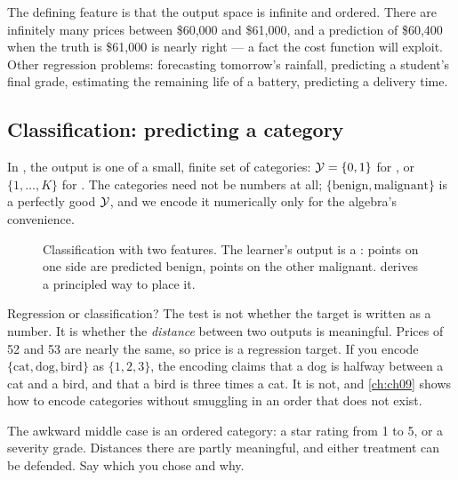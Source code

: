The defining feature is that the output space is infinite and ordered. There are
infinitely many prices between \$60{,}000 and \$61{,}000, and a prediction of
\$60{,}400 when the truth is \$61{,}000 is nearly right --- a fact the cost
function will exploit. Other regression problems: forecasting tomorrow's
rainfall, predicting a student's final grade, estimating the remaining life of a
battery, predicting a delivery time.

\subsection{Classification: predicting a category}

In , the output is one of a small, finite set of categories:
$\mathcal{Y} = \{0,1\}$ for , or $\{1,\dots,K\}$ for
. The categories need not be numbers at all;
$\{\text{benign}, \text{malignant}\}$ is a perfectly good $\mathcal{Y}$, and we
encode it numerically only for the algebra's convenience.

\begin{figure}[htbp]
  \centering
  \caption{Classification with two features. The learner's output is a
  : points on one side are predicted benign, points on
  the other malignant.  derives a principled way to place it.}
  \label{fig:classification}
\end{figure}

\begin{pitfall}{Regression or classification?}
The test is not whether the target is written as a number. It is whether the
\emph{distance} between two outputs is meaningful. Prices of 52 and 53 are nearly
the same, so price is a regression target. If you encode
$\{\text{cat},\text{dog},\text{bird}\}$ as $\{1,2,3\}$, the encoding claims that
a dog is halfway between a cat and a bird, and that a bird is three times a cat.
It is not, and \cref{ch:ch09} shows how to encode categories without smuggling in
an order that does not exist.

The awkward middle case is an ordered category: a star rating from 1 to 5, or a
severity grade. Distances there are partly meaningful, and either treatment can
be defended. Say which you chose and why.
\end{pitfall}


